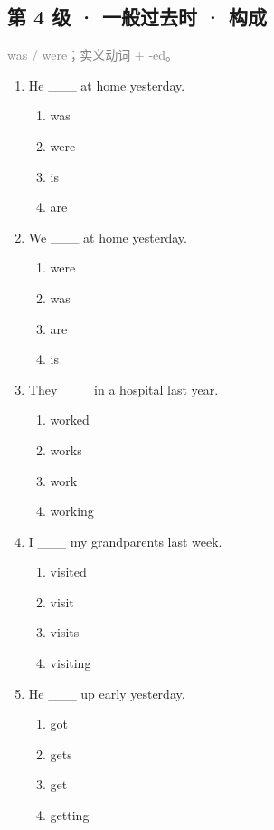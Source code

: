 \documentclass[11pt,a4paper]{ctexart}
\begin{document}
\subsection*{第 4 级 · 一般过去时 · 构成}
\noindent\textcolor{gray}{was / were；实义动词 + -ed。}\par\smallskip
\begin{enumerate}[leftmargin=*,itemsep=4pt]
\item He \_\_\_ at home yesterday.
\begin{enumerate}[label=\Alph*.,leftmargin=2em,itemsep=1pt,topsep=2pt]
\item was
\item were
\item is
\item are
\end{enumerate}
\item We \_\_\_ at home yesterday.
\begin{enumerate}[label=\Alph*.,leftmargin=2em,itemsep=1pt,topsep=2pt]
\item were
\item was
\item are
\item is
\end{enumerate}
\item They \_\_\_ in a hospital last year.
\begin{enumerate}[label=\Alph*.,leftmargin=2em,itemsep=1pt,topsep=2pt]
\item worked
\item works
\item work
\item working
\end{enumerate}
\item I \_\_\_ my grandparents last week.
\begin{enumerate}[label=\Alph*.,leftmargin=2em,itemsep=1pt,topsep=2pt]
\item visited
\item visit
\item visits
\item visiting
\end{enumerate}
\item He \_\_\_ up early yesterday.
\begin{enumerate}[label=\Alph*.,leftmargin=2em,itemsep=1pt,topsep=2pt]
\item got
\item gets
\item get
\item getting
\end{enumerate}

\end{enumerate}
\end{document}

